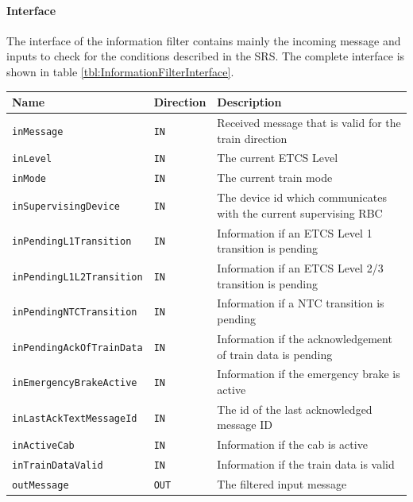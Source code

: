 \paragraph{Interface}
The interface of the information filter contains mainly the incoming
message and inputs to check for the conditions described in the
SRS. The complete interface is shown in table \ref{tbl:InformationFilterInterface}.

\begin{minipage}{\linewidth}
  \scriptsize
  \begin{tabular}{| l | l | l |}
    \hline
    \textbf{Name}                    & \textbf{Direction} & \textbf{Description}                                        \\ 
    \hline
    \texttt{inMessage}               & \texttt{IN}        & Received message that is valid for the train direction      \\
    \texttt{inLevel}                 & \texttt{IN}        & The current ETCS Level                                      \\
    \texttt{inMode}                  & \texttt{IN}        & The current train mode                                      \\
    \texttt{inSupervisingDevice}     & \texttt{IN}        & The device id which communicates with the current supervising
  RBC                                                                                                                   \\
    \texttt{inPendingL1Transition}   & \texttt{IN}        & Information if an ETCS Level 1 transition is pending        \\
    \texttt{inPendingL1L2Transition} & \texttt{IN}        & Information if an ETCS Level 2/3 transition is pending      \\
    \texttt{inPendingNTCTransition}  & \texttt{IN}        & Information if a NTC transition is pending                  \\
    \texttt{inPendingAckOfTrainData} & \texttt{IN}        & Information if the acknowledgement of train data is pending \\
    \texttt{inEmergencyBrakeActive}  & \texttt{IN}        & Information if the emergency brake is active                \\
    \texttt{inLastAckTextMessageId}  & \texttt{IN}        & The id of the last acknowledged message ID                  \\
    \texttt{inActiveCab}             & \texttt{IN}        & Information if the cab is active                            \\
    \texttt{inTrainDataValid}        & \texttt{IN}        & Information if the train data is valid                      \\
    \texttt{outMessage}              & \texttt{OUT}       & The filtered input message                                  \\
    \hline
  \end{tabular}
  \label{tbl:InformationFilterInterface}
\end{minipage}

